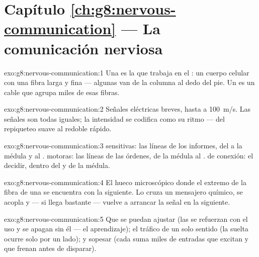 \section*{Capítulo \ref{ch:g8:nervous-communication} --- La comunicación nerviosa}

\begin{solution}{exo:g8:nervous-communication:1}
Una  es la  que trabaja en el : un cuerpo
celular con una fibra larga y fina --- algunas van de la columna al
dedo del pie. Un  es un cable que agrupa miles de esas fibras.
\end{solution}

\begin{solution}{exo:g8:nervous-communication:2}
Señales eléctricas breves, hasta a \qty{100}{m/s}. Las señales son
todas iguales; la intensidad se codifica como su ritmo --- del
repiqueteo suave al redoble rápido.
\end{solution}

\begin{solution}{exo:g8:nervous-communication:3}
 sensitivas: las líneas de los informes, del  a la médula y al .  motoras: las líneas de las
órdenes, de la médula al .  de conexión: el decidir,
dentro del  y de la médula.
\end{solution}

\begin{solution}{exo:g8:nervous-communication:4}
El hueco microscópico donde el extremo de la fibra de una  se
encuentra con la  siguiente. Lo cruza un mensajero químico, se
acopla y --- si llega bastante --- vuelve a arrancar la señal en la
 siguiente.
\end{solution}

\begin{solution}{exo:g8:nervous-communication:5}
Que se puedan ajustar (las  se refuerzan con el uso y se apagan
sin él --- el aprendizaje); el tráfico de un solo sentido (la suelta
ocurre solo por un lado); y sopesar (cada  suma miles de
entradas que excitan y que frenan antes de disparar).
\end{solution}

